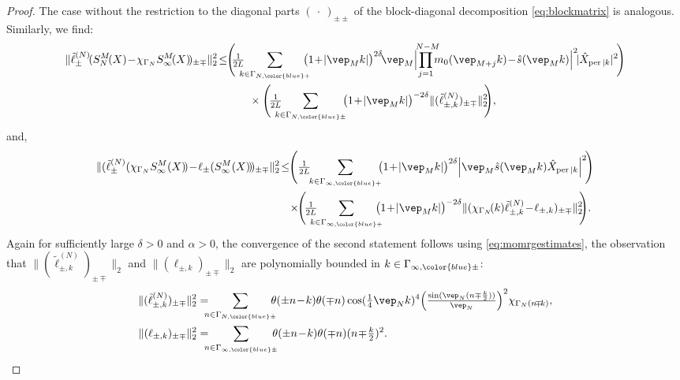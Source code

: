 \documentclass[a4paper, 11pt]{article}
\DeclareMathOperator{\1}{\mathds{1}}
\DeclareMathOperator{\per}{per}
\begin{document}
\begin{proof}
The case without the restriction to the diagonal parts $(\!\ \cdot\!\ )_{\pm\pm}$ of the block-diagonal decomposition \eqref{eq:blockmatrix} is analogous. Similarly, we find:
\begin{align*}
\|\tilde{\ell}^{(N)}_{\pm}\!(S^{M}_{N}\!(X)\!-\!\chi_{\Gamma_{N}}S^{M}_{\infty}\!(X)\!)_{\pm\mp}\|_{2}^{2} & \!\leq\!\!\Bigg(\!\!\tfrac{1}{2L}\!\!\!\!\sum_{k\in\Gamma_{N,{\color{blue}+}}}\!\!\!\!\!\big(1\!+\!|\vep_{M}k|\big)^{2\delta}\!\vep_{M}\Big|\!\!\!\!\prod_{j=1}^{\ N-M}\!\!\!\!m_{0}(\vep_{M+j}k)\!-\!\hat{s}(\vep_{M}k)\Big|^{2}\!|\hat{X}_{\per|k}|^{2}\!\Bigg) \\
 &\hspace{1cm} \times\Bigg(\!\tfrac{1}{2L}\!\!\!\!\!\sum_{k\in\Gamma_{N,{\color{blue}\pm}}}\!\!\!\big(1\!+\!|\vep_{M}k|\big)^{-2\delta}\|(\tilde{\ell}^{(N)}_{\pm,k})_{\pm\mp}\|_{2}^{2}\!\!\Bigg),
\end{align*}
and,
\begin{align*}
\|(\tilde{\ell}^{(N)}_{\pm}(\chi_{\Gamma_{N}}S^{M}_{\infty}(X)\!)\!-\!\ell_{\pm}(S^{M}_{\infty}(X)\!)\!)_{\pm\mp}\|_{2}^{2} & \!\leq\!\!\Bigg(\tfrac{1}{2L}\!\!\sum_{k\in\Gamma_{\infty,{\color{blue}+}}}\!\!\!\big(1\!+\!|\vep_{M}k|\big)^{2\delta}\Big|\vep_{M}\hat{s}(\vep_{M}k)\hat{X}_{\per|k}\Big|^{2}\!\Bigg) \\
 &\hspace{0.25cm}\times\!\!\Bigg(\!\tfrac{1}{2L}\!\!\!\!\!\sum_{k\in\Gamma_{\infty,{\color{blue}+}}}\!\!\!\!\!\big(1\!+\!|\vep_{M}k|\big)^{-2\delta}\|(\chi_{\Gamma_{N}}\!(k)\tilde{\ell}^{(N)}_{\pm,k}\!-\!\ell_{\pm,k})_{\pm\mp}\|_{2}^{2}\!\!\Bigg).
\end{align*}
Again for sufficiently large $\delta>0$ and $\alpha>0$, the convergence of the second statement follows using \eqref{eq:momrgestimates}, the observation that $\|(\tilde{\ell}^{(N)}_{\pm,k})_{\pm\mp}\|_{2}$ and $\|(\ell_{\pm,k})_{\pm\mp}\|_{2}$ are polynomially bounded in $k\in\Gamma_{\infty,{\color{blue}\pm}}$:
\begin{align*}
\|(\tilde{\ell}^{(N)}_{\pm,k})_{\pm\mp}\|_{2}^{2} & = \!\!\!\!\sum_{n\in\Gamma_{N,{\color{blue}\pm}}}\!\!\!\!\theta(\pm n\!-\!k)\theta(\mp n)\cos(\tfrac{1}{4}\vep_{N}k)^{4}\Big(\tfrac{\sin(\vep_{N}(n\mp\frac{k}{2}))}{\vep_{N}}\Big)^{2}\chi_{\Gamma_{N}(n\!\mp\!k)}, \\
\|(\ell_{\pm,k})_{\pm\mp}\|_{2}^{2} & = \!\!\!\!\sum_{n\in\Gamma_{\infty,{\color{blue}\pm}}}\!\!\!\!\theta(\pm n\!-\!k)\theta(\mp n)(n\!\mp\!\tfrac{k}{2})^{2}.
\end{align*}


\end{proof}
\end{document}
